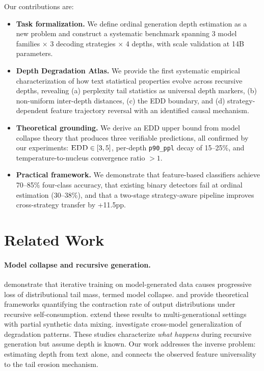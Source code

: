 \documentclass[11pt,a4paper]{article}
\newcommand{\edd}{\textsc{EDD}}
\begin{document}
Our contributions are:
\begin{itemize}[nosep,leftmargin=*]
    \item \textbf{Task formalization.} We define ordinal generation depth estimation as a new problem and construct a systematic benchmark spanning 3 model families $\times$ 3 decoding strategies $\times$ 4 depths, with scale validation at 14B parameters.
    \item \textbf{Depth Degradation Atlas.} We provide the first systematic empirical characterization of how text statistical properties evolve across recursive depths, revealing (a) perplexity tail statistics as universal depth markers, (b) non-uniform inter-depth distances, (c) the \edd{} boundary, and (d) strategy-dependent feature trajectory reversal with an identified causal mechanism.
    \item \textbf{Theoretical grounding.} We derive an \edd{} upper bound from model collapse theory that produces three verifiable predictions, all confirmed by our experiments: $\edd \in [3,5]$, per-depth \texttt{p90\_ppl} decay of 15--25\%, and temperature-to-nucleus convergence ratio $> 1$.
    \item \textbf{Practical framework.} We demonstrate that feature-based classifiers achieve 70--85\% four-class accuracy, that existing binary detectors fail at ordinal estimation (30--38\%), and that a two-stage strategy-aware pipeline improves cross-strategy transfer by +11.5pp.
\end{itemize}

\section{Related Work}

\paragraph{Model collapse and recursive generation.}
\citet{shumailov2024model} demonstrate that iterative training on model-generated data causes progressive loss of distributional tail mass, termed model collapse. \citet{alemohammad2024selfconsuming} and \citet{dohmatob2024tale} provide theoretical frameworks quantifying the contraction rate of output distributions under recursive self-consumption. \citet{gerstgrasser2024model} extend these results to multi-generational settings with partial synthetic data mixing. \citet{drayson2025investigatinggeneralizabilitygenerationdegradation} investigate cross-model generalization of degradation patterns. These studies characterize \emph{what happens} during recursive generation but assume depth is known. Our work addresses the inverse problem: estimating depth from text alone, and connects the observed feature universality to the tail erosion mechanism.
\end{document}
